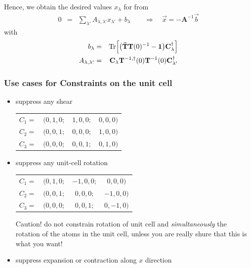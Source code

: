 \documentclass[final,12pt]{article}
\newcommand{\mat}[1]{\mathbf{#1}}
\newcommand{\Tr}{\mathrm{Tr}}      %
\begin{document}
{{{{{{Hence, we obtain the desired values $x_\lambda$ for from
  \begin{eqnarray}
0&=&\sum_{\lambda'}A_{\lambda,\lambda'}x_{\lambda'}+b_\lambda 
\qquad\Rightarrow\quad \vec{x}=-\mat{A}^{-1}\vec{b}
  \end{eqnarray}
with
  \begin{eqnarray}
    b_\lambda&=&\Tr\Bigl[\bigl(\mat{\bar{T}}\mat{T}(0)^{-1}-\mat{1}\bigr)
                      \mat{C}_\lambda^\dagger\Bigr]
 \nonumber\\
    A_{\lambda,\lambda'}
        &=&\mat{C}_\lambda \mat{T}^{-1,\dagger}(0)\mat{T}^{-1}(0)\mat{C}^\dagger_{\lambda'}
  \end{eqnarray}



\subsubsection{Use cases for Constraints on the unit cell}
\label{sec:usecasecellconstr}
\begin{itemize}
    \item suppress any shear
\begin{center}
\begin{tabular}{|cccc|}
\hline
$C_1=$&$(0,1,0;$&$ 1,0,0 ;$&$ 0,0,0)$\\
$C_2=$&$(0,0,1;$&$ 0,0,0 ;$&$ 1,0,0)$\\
$C_3=$&$(0,0,0;$&$ 0,0,1 ;$&$ 0,1,0)$\\
\hline
\end{tabular}
\end{center}
%
\item suppress any unit-cell rotation\\
\begin{center}
\begin{tabular}{|cccc|}
\hline
$C_1=$&$(0,1,0;$&$ -1,0,0;$&$ 0,0,0)$\\
$C_2=$&$(0,0,1;$&$ 0,0,0 ;$&$ -1,0,0)$\\
$C_3=$&$(0,0,0;$&$ 0,0,1 ;$&$ 0,-1,0)$\\
\hline
\end{tabular}
\end{center}
Caution! do not constrain rotation of unit cell and
\textit{simultaneously} the rotation of the atoms in the unit cell,
unless you are really shure that this is what you want!
%
\item suppress expansion or contraction along $x$ direction

\end{itemize}}}}}}}
\end{document}
